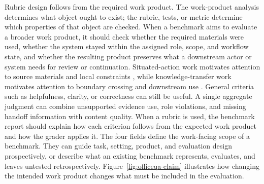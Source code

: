\documentclass[10pt]{article}
\begin{document}
Rubric design follows from the required work product. The work-product analysis determines what object ought to exist; the rubric, tests, or metric determine which properties of that object are checked.
When a benchmark aims to evaluate a broader work product, it should check whether the required materials were used, whether the system stayed within the assigned role, scope, and workflow state, and whether the resulting product preserves what a downstream actor or system needs for review or continuation.
Situated-action work motivates attention to source materials and local constraints \citep{suchman1987plans}, while knowledge-transfer work motivates attention to boundary crossing and downstream use \citep{carlile2002pragmatic,carlile2004transferring}.
General criteria such as helpfulness, clarity, or correctness can still be useful. A single aggregate judgment can combine unsupported evidence use, role violations, and missing handoff information with content quality.
When a rubric is used, the benchmark report should explain how each criterion follows from the expected work product and how the grader applies it. The four fields define the work-facing scope of a benchmark. They can guide task, setting, product, and evaluation design prospectively, or describe what an existing benchmark represents, evaluates, and leaves untested retrospectively. Figure~\ref{fig:officeqa-claim} illustrates how changing the intended work product changes what must be included in the evaluation.
\end{document}
